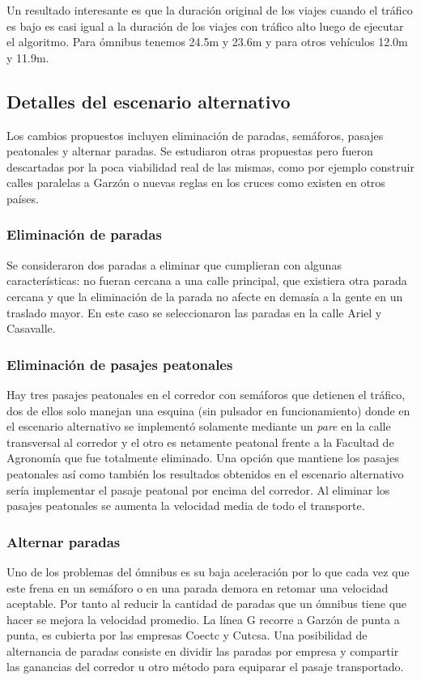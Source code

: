 Un resultado interesante es que la duración original de los viajes cuando el tráfico es bajo es casi igual a la duración de los viajes con tráfico alto luego de ejecutar el algoritmo.
Para ómnibus tenemos 24.5m y 23.6m y  para otros vehículos 12.0m y 11.9m.

\subsection{Detalles del escenario alternativo}
Los cambios propuestos incluyen eliminación de paradas, semáforos, pasajes peatonales y alternar paradas. Se estudiaron otras propuestas pero fueron descartadas por la poca viabilidad real de las mismas, como por ejemplo construir calles paralelas a Garzón o nuevas reglas en los cruces como existen en otros países.

\subsubsection{Eliminación de paradas}
Se consideraron dos paradas a eliminar que cumplieran con algunas características: no fueran cercana a una calle principal, que existiera otra parada cercana y que la eliminación de la parada no afecte en demasía a la gente en un traslado mayor.
En este caso se seleccionaron las paradas en la calle Ariel y Casavalle.

\subsubsection{Eliminación de pasajes peatonales}
Hay tres pasajes peatonales en el corredor con semáforos que detienen el tráfico, dos de ellos solo manejan una esquina (sin pulsador en funcionamiento) donde en el escenario alternativo se implementó solamente mediante un \emph{pare} en la calle transversal al corredor y el otro es netamente peatonal frente a la Facultad de Agronomía que fue totalmente eliminado. Una opción que mantiene los pasajes peatonales así como también los resultados obtenidos en el escenario alternativo sería implementar el pasaje peatonal por encima del corredor. Al eliminar los pasajes peatonales se aumenta la velocidad media de todo el transporte.

\subsubsection{Alternar paradas}

Uno de los problemas del ómnibus es su baja aceleración por lo que cada vez que este frena en un semáforo o en una parada demora en retomar una velocidad aceptable. Por tanto al reducir la cantidad de paradas que un ómnibus tiene que hacer se mejora la velocidad promedio.
La línea G recorre a Garzón de punta a punta, es cubierta por las empresas Coectc y Cutcsa. Una posibilidad de alternancia de paradas consiste en dividir las paradas por empresa y compartir las ganancias del corredor u otro método para equiparar el pasaje transportado. 

